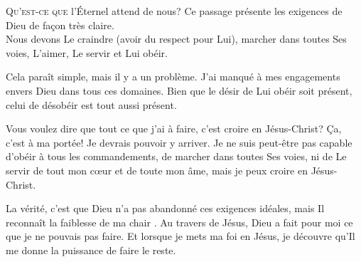 \jrnlmonth





\lettrine{Q}{u'est-ce que} l'Éternel attend de nous?
 Ce passage présente les exigences de Dieu de façon très claire. \\[1ex]
 Nous devons Le craindre (avoir du respect pour Lui), marcher dans toutes Ses voies,
 L'aimer, Le servir et Lui obéir.

 Cela paraît simple, mais il y a un problème. J'ai manqué à mes engagements envers Dieu dans tous ces domaines.
 Bien que le désir de Lui obéir soit présent, celui de désobéir est tout
 aussi présent.


Vous voulez dire que tout ce que j'ai à faire,
  c'est croire en Jésus-Christ? Ça, c'est à ma portée!
  Je devrais pouvoir y arriver.
  Je ne suis peut-être pas capable d'obéir à tous les commandements,
  de marcher dans toutes Ses voies, ni de Le servir de tout mon c\oe{}ur
  et de toute mon âme, mais je peux croire en Jésus-Christ. 

La vérité, c'est que Dieu n'a pas abandonné ces exigences idéales,
  mais Il reconnaît la faiblesse de ma chair .
  Au travers de Jésus, Dieu a fait pour moi ce que je ne pouvais
  pas faire. Et lorsque je mets ma foi en Jésus,
  je découvre qu'Il me donne la puissance de faire le reste.

